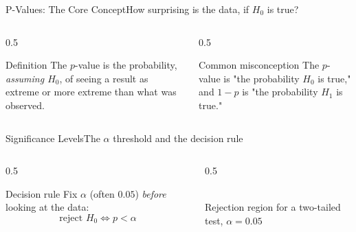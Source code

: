 \documentclass[aspectratio=169,11pt]{beamer}
\begin{document}
\begin{frame}{P-Values: The Core Concept}{How surprising is the data, if $H_0$ is true?}
  \begin{columns}[T]
    \begin{column}{0.5\textwidth}
      \begin{block}{Definition}
        \small The $p$-value is the probability, \emph{assuming $H_0$},
        of seeing a result as extreme or more extreme than what was
        observed.
      \end{block}
    \end{column}
    \begin{column}{0.5\textwidth}
      \begin{alertblock}{Common misconception}
        \small The $p$-value is  "the probability $H_0$ is
        true," and $1-p$ is  "the probability $H_1$ is
        true."
      \end{alertblock}
    \end{column}
  \end{columns}
\end{frame}

\begin{frame}{Significance Levels}{The $\alpha$ threshold and the decision rule}
  \begin{columns}[T]
    \begin{column}{0.5\textwidth}
      \begin{block}{Decision rule}
        \small Fix $\alpha$ (often $0.05$) \emph{before} looking at the
        data:
        \[ \text{reject } H_0 \iff p < \alpha \]
      \end{block}
    \end{column}
    \begin{column}{0.5\textwidth}
      \centering
      \\
      \scriptsize Rejection region for a two-tailed test, $\alpha{=}0.05$
    \end{column}
  \end{columns}
\end{frame}
\end{document}
